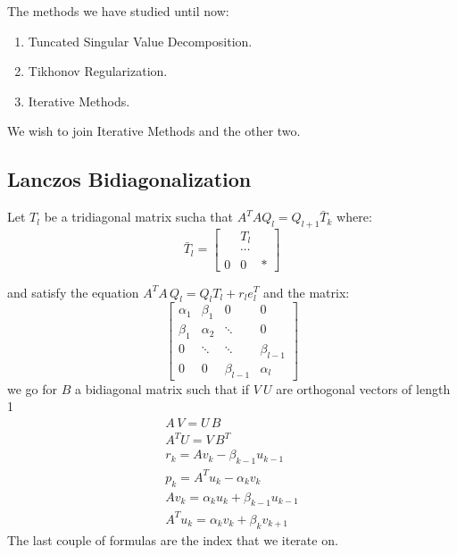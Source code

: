 The methods we have studied until now:
\begin{enumerate}
\item Tuncated Singular Value Decomposition.
\item Tikhonov Regularization.
\item Iterative Methods.
\end{enumerate}

We wish to join Iterative Methods and the other two.

\subsection{Lanczos Bidiagonalization}
Let $T_l$ be a tridiagonal matrix sucha that $A^TA Q_l = Q_{l+1} \bar T_k$ where:
\[ \bar T_l = \left[ \begin{array}{ccc} &T_l& \\ 
&\cdots& \\
0 & 0 & *
\end{array} \right] \]

and satisfy the equation $A^TA\,Q_l = Q_l T_l + r_l e_l^T$
and the matrix:
$$\begin{bmatrix} 
\alpha_1 & \beta_1 & 0 & 0 \\
\beta_1  & \alpha_2& \ddots & 0\\
0 & \ddots & \ddots & \beta_{l-1} \\
0 & 0 & \beta_{l-1} & \alpha_l
\end{bmatrix}$$
we go for $B$ a bidiagonal matrix such that if $V\ U$ are orthogonal vectors of length 1
\begin{gather*}
A\, V = U\,B \\
A^T U = V\, B^T \\
r_k = Av_k - \beta_{k-1} u_{k-1} \\
p_k = A^T u_k - \alpha_k v_k \\
Av_k = \alpha_k u_k + \beta_{k-1} u_{k-1} \\
A^T u_k = \alpha_k v_k + \beta_k v_{k+1}
\end{gather*}
The last couple of formulas are the index that we iterate on.
